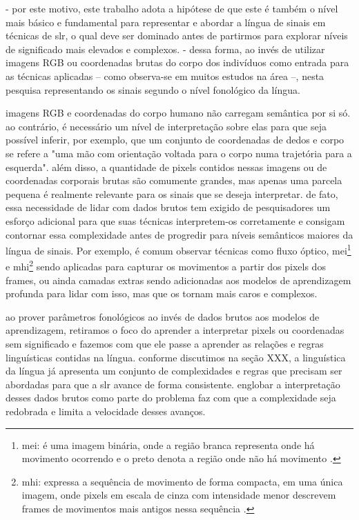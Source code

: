 - por este motivo, este trabalho adota a hipótese de que este é também o nível mais básico e fundamental para representar e abordar a língua de sinais em técnicas de \acrshort{slr}, o qual deve ser dominado antes de partirmos para explorar níveis de significado mais elevados e complexos. 
- dessa forma, ao invés de utilizar imagens RGB ou coordenadas brutas do corpo dos indivíduos como entrada para as técnicas aplicadas -- como observa-se em muitos estudos na área --, nesta pesquisa representando os sinais segundo o nível fonológico da língua.

imagens RGB e coordenadas do corpo humano não carregam semântica por si só. ao contrário, é necessário um nível de interpretação sobre elas para que seja possível inferir, por exemplo, que um conjunto de coordenadas de dedos e corpo se refere a "uma mão com orientação voltada para o corpo numa trajetória para a esquerda". 
além disso, a quantidade de pixels contidos nessas imagens ou de coordenadas corporais brutas são comumente grandes, mas apenas uma parcela pequena é realmente relevante para os sinais que se deseja interpretar.
de fato, essa necessidade de lidar com dados brutos tem exigido de pesquisadores um esforço adicional para que suas técnicas interpretem-os corretamente e consigam contornar essa complexidade antes de progredir para níveis semânticos maiores da língua de sinais. Por exemplo, é comum observar técnicas como fluxo óptico, 
\acrshort{mei}\footnote{
    \acrlong{mei}: é uma imagem binária, onde a região branca representa onde há movimento ocorrendo e o preto denota a região onde não há movimento \cite{ahad-2012-mhi-for-action}.
}
e
\acrshort{mhi}\footnote{
    \acrlong{mhi}: expressa a sequência de movimento de forma compacta, em uma única imagem, onde pixels em escala de cinza com intensidade menor descrevem frames de movimentos mais antigos nessa sequência \cite{ahad-2012-mhi}.
} 
sendo aplicadas para capturar os movimentos a partir dos pixels dos frames, ou ainda camadas extras sendo adicionadas aos modelos de aprendizagem profunda para lidar com isso, mas que os tornam mais caros e complexos. 


ao prover parâmetros fonológicos ao invés de dados brutos aos modelos de aprendizagem, retiramos o foco do aprender a interpretar pixels ou coordenadas sem significado e fazemos com que ele passe a aprender as relações e regras linguísticas contidas na língua. conforme discutimos na seção XXX, a linguística da língua já apresenta um conjunto de complexidades e regras que precisam ser abordadas para que a \acrshort{slr} avance de forma consistente. englobar a interpretação desses dados brutos como parte do problema faz com que a complexidade seja redobrada e limita a velocidade desses avanços.


